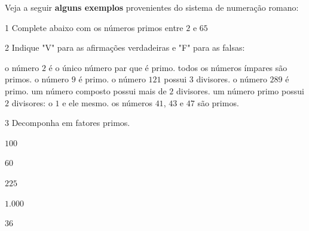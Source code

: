 {\noindent Veja a seguir \textbf{alguns exemplos} provenientes do sistema de numeração
romano:




\num{1}  Complete abaixo com os números primos entre $2$ e $65$



\num{2}  Indique "V" para as afirmações verdadeiras e "F" para as falsas:

\begin{boxlist}
\boxitem[\rosa{V}] o número $2$ é o único número par que é primo.
\boxitem[\rosa{F}] todos os números ímpares são primos.
\boxitem[\rosa{F}] o número $9$ é primo.
\boxitem[\rosa{V}] o número $121$ possui $3$ divisores.
\boxitem[\rosa{F}] o número $289$ é primo.
\boxitem[\rosa{V}] um número composto possui mais de $2$ divisores.
\boxitem[\rosa{V}] um número primo possui $2$ divisores: o $1$ e ele mesmo.
\boxitem[\rosa{V}] os números $41$, $43$ e $47$ são primos.
\end{boxlist}

\num{3} Decomponha em fatores primos.

\begin{escolha}
\item  $100$    
\item  $60$     
\item  $225$    
\item  $1.000$  
\item  $36$     
\end{escolha}

}
